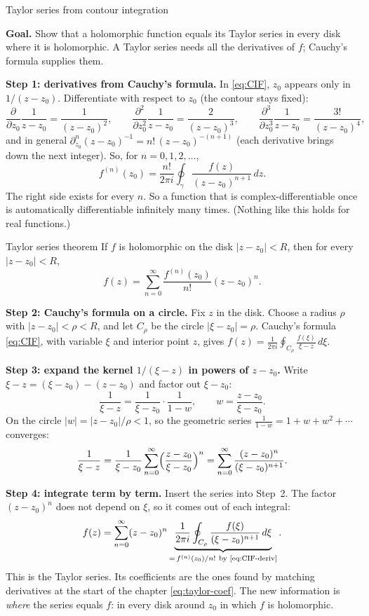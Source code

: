 \documentclass[11pt]{beamer}
\begin{document}
\begin{frame}[allowframebreaks=1.00]{Taylor series from contour integration}
\footnotesize

\textbf{Goal.} Show that a holomorphic function equals its Taylor series in every disk where it
is holomorphic. A Taylor series needs all the derivatives of \(f\); Cauchy's formula supplies them.

\textbf{Step 1: derivatives from Cauchy's formula.} In \eqref{eq:CIF}, \(z_0\) appears only in
\(1/(z-z_0)\). Differentiate with respect to \(z_0\) (the contour stays fixed):
\[
 \frac{\partial}{\partial z_0}\frac1{z-z_0}=\frac1{(z-z_0)^2},\qquad
 \frac{\partial^2}{\partial z_0^2}\frac1{z-z_0}=\frac{2}{(z-z_0)^3},\qquad
 \frac{\partial^3}{\partial z_0^3}\frac1{z-z_0}=\frac{3!}{(z-z_0)^4},
\]
and in general \(\partial^n_{z_0}(z-z_0)^{-1}=n!\,(z-z_0)^{-(n+1)}\) (each derivative brings down the next
integer).
So, for \(n=0,1,2,\ldots\),
\begin{equation}
 f^{(n)}(z_0)=\frac{n!}{2\pi i}
  \oint_\gamma\frac{f(z)}{(z-z_0)^{n+1}}\,dz.
 \label{eq:CIF-deriv}
\end{equation}
The right side exists for every \(n\). So a function that is complex-differentiable once is
automatically differentiable infinitely many times. (Nothing like this holds for real functions.)


\begin{block}{Taylor series theorem}
If $f$ is holomorphic on the disk $|z-z_0|<R$, then for every $|z-z_0|<R$,
\[
 f(z)=\sum_{n=0}^{\infty}\frac{f^{(n)}(z_0)}{n!}(z-z_0)^n.
\]
\end{block}
\textbf{Step 2: Cauchy's formula on a circle.} Fix \(z\) in the disk. Choose a radius \(\rho\) with
\(|z-z_0|<\rho<R\), and let \(C_\rho\) be the circle \(|\xi-z_0|=\rho\). Cauchy's formula \eqref{eq:CIF},
with variable \(\xi\) and interior point \(z\), gives
\(f(z)=\frac{1}{2\pi i}\oint_{C_\rho}\frac{f(\xi)}{\xi-z}\,d\xi\).


\textbf{Step 3: expand the kernel \(1/(\xi-z)\) in powers of \(z-z_0\).} Write
\(\xi-z=(\xi-z_0)-(z-z_0)\) and factor out \(\xi-z_0\):
\[
 \frac1{\xi-z}=\frac1{\xi-z_0}\cdot\frac1{1-w},\qquad w=\frac{z-z_0}{\xi-z_0}.
\]
On the circle \(|w|=|z-z_0|/\rho<1\), so the geometric series \(\frac1{1-w}=1+w+w^2+\cdots\) converges:
\[
 \frac1{\xi-z}=\frac1{\xi-z_0}\sum_{n=0}^{\infty}\Bigl(\frac{z-z_0}{\xi-z_0}\Bigr)^n
 =\sum_{n=0}^{\infty}\frac{(z-z_0)^n}{(\xi-z_0)^{n+1}}.
\]


\textbf{Step 4: integrate term by term.} Insert the series into Step~2. The factor \((z-z_0)^n\)
does not depend on \(\xi\), so it comes out of each integral:
\[
 f(z)=\sum_{n=0}^{\infty}(z-z_0)^n
 \underbrace{\frac1{2\pi i}\oint_{C_\rho}
     \frac{f(\xi)}{(\xi-z_0)^{n+1}}\,d\xi}_{=\,f^{(n)}(z_0)/n!\ \text{by \eqref{eq:CIF-deriv}}}.
\]
This is the Taylor series. Its coefficients are the ones found by matching derivatives at the start
of the chapter \eqref{eq:taylor-coef}. The new information is \emph{where} the series equals \(f\):
in every disk around \(z_0\) in which \(f\) is holomorphic.



\end{frame}
\end{document}
